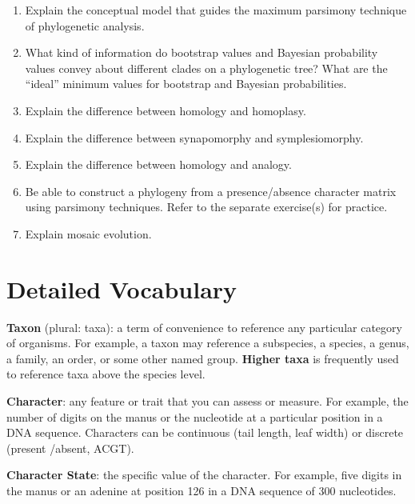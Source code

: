 \documentclass[letterpaper]{tufte-handout}
\begin{document}
\begin{enumerate}
	
	\item Explain the conceptual model that guides the maximum parsimony technique of phylogenetic analysis.

	\item What kind of information do bootstrap values and Bayesian probability values convey about different clades on a phylogenetic tree?  What are the ``ideal'' minimum values for bootstrap and Bayesian probabilities.
	
	\item Explain the difference between homology and homoplasy.
	
	\item Explain the difference between synapomorphy and symplesiomorphy.
	
	\item Explain the difference between homology and analogy.
	
	\item Be able to construct a phylogeny from a presence/absence character matrix using parsimony techniques. Refer to the separate exercise(s) for practice.
	
	\item Explain mosaic evolution.	

\end{enumerate}

\section{Detailed Vocabulary}

\textbf{Taxon} (plural: taxa): a term of convenience to reference any particular category of organisms. For example, a taxon may reference a subspecies, a species, a genus, a family, an order, or some other named group. \textbf{Higher taxa} is frequently used to reference taxa above the species level.

\noindent\textbf{Character}: any feature or trait that you can assess or measure.  For example, the number of digits on the manus or the nucleotide at a particular position in a DNA sequence.  Characters can be continuous (tail length, leaf width) or discrete (present /absent, ACGT).

\noindent\textbf{Character State}: the specific value of the character. For example, five digits in the manus or an adenine at position 126 in a DNA sequence of 300 nucleotides. 
\end{document}
